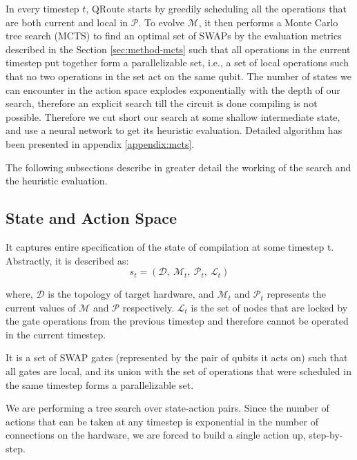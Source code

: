 In every timestep $t$, QRoute starts by greedily scheduling all the operations that are both current and local in $\mathcal{P}$. To evolve $\mathcal{M}$, it then performs a Monte Carlo tree search (MCTS) to find an optimal set of SWAPs by the evaluation metrics described in the Section \ref{sec:method-mcts} such that all operations in the current timestep put together form a parallelizable set, i.e., a set of local operations such that no two operations in the set act on the same qubit. The number of states we can encounter in the action space explodes exponentially with the depth of our search, therefore an explicit search till the circuit is done compiling is not possible. Therefore we cut short our search at some shallow intermediate state, and use a neural network to get its heuristic evaluation. Detailed algorithm has been presented in appendix \ref{appendix:mcts}.


The following subsections describe in greater detail the working of the search and the heuristic evaluation.

\subsection{\label{sec:method-state} State and Action Space}

\begin{defn}[State]
    It captures entire specification of the state of compilation at some timestep t. Abstractly, it is described as:
    \begin{equation}
        s_{t} = (\mathcal{D}, \ \mathcal{M}_{t},\ \mathcal{P}_{t},\ \mathcal{L}_{t})
    \end{equation}

    where, $\mathcal{D}$ is the topology of target hardware, and $\mathcal{M}_t$ and $\mathcal{P}_t$ represents the current values of $\mathcal{M}$ and $\mathcal{P}$ respectively. $\mathcal{L}_{t}$ is the set of nodes that are locked by the gate operations from the previous timestep and therefore cannot be operated in the current timestep. 
\end{defn}


\begin{defn}[Action]
    It is a set of SWAP gates (represented by the pair of qubits it acts on) such that all gates are local, and its union with the set of operations that were scheduled in the same timestep forms a parallelizable set.
\end{defn}

We are performing a tree search over state-action pairs. Since the number of actions that can be taken at any timestep is exponential in the number of connections on the hardware, we are forced to build a single action up, step-by-step. 

